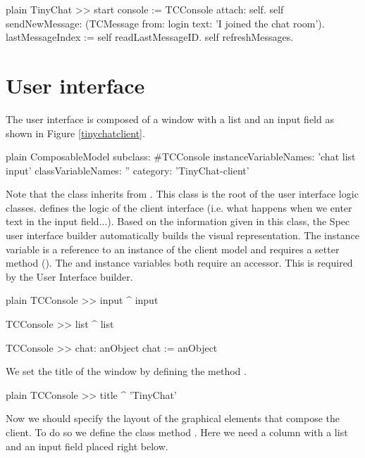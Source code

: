 \documentclass[10pt,twoside,english]{_support/latex/sbabook/sbabook}
\begin{document}
\begin{displaycode}{plain}
TinyChat >> start
	console := TCConsole attach: self.
	self sendNewMessage: (TCMessage from: login text: 'I joined the chat room').
	lastMessageIndex := self readLastMessageID.
	self refreshMessages.
\end{displaycode}
\section{User interface}
The user interface is composed of a window with a list and an input field as shown in Figure \ref{tinychatclient}. 

\begin{displaycode}{plain}
ComposableModel subclass: #TCConsole
	instanceVariableNames: 'chat list input'
	classVariableNames: ''
	category: 'TinyChat-client'
\end{displaycode}

Note that the class  inherits from . This class is the root of the user interface logic classes.
  defines the logic of the client interface (i.e. what happens when we enter text in the input field...). Based on the information given in this class, the Spec user interface builder automatically builds the visual representation. 
The  instance variable is a reference to an instance of the client model  and requires a setter method (). The  and  instance variables both require an accessor. This is required by the User Interface builder.

\begin{displaycode}{plain}
TCConsole >> input
	^ input

TCConsole >> list
	^ list

TCConsole >> chat: anObject
	chat := anObject
\end{displaycode}

We set the title of the window by defining the method .

\begin{displaycode}{plain}
TCConsole >> title
	^ 'TinyChat'
\end{displaycode}

Now we should specify the layout of the graphical elements that compose the client.
To do so we define the class method . Here we need a column with a list and an input field placed right below. 
\end{document}
